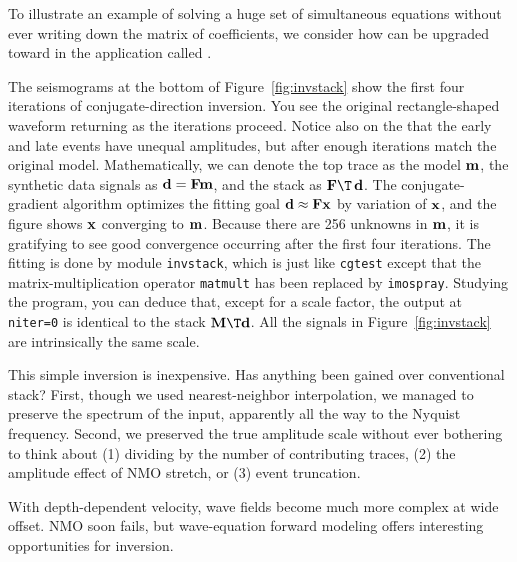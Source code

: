 To illustrate an example of solving a huge set of simultaneous
equations without ever writing down the matrix of coefficients,
we consider how
{\it {}} can be upgraded toward
{\it {}} in the application called .
\par
The seismograms at the bottom of Figure~\ref{fig:invstack}
show the first four iterations of conjugate-direction inversion.
You see the original rectangle-shaped waveform returning
as the iterations proceed.
Notice also on the 
that the early and late events have unequal amplitudes,
but after enough iterations match the original model.
Mathematically,
we can denote the top trace as the model $\bold m$,
the synthetic data signals as $\bold d = \bold F \bold m$,
and the stack as $\bold F\T\,\bold d$.
The conjugate-gradient algorithm optimizes the fitting goal
$\bold d \approx \bold F \bold x$ by variation of $\bold x$,
and the figure shows $\bold x$ converging to $\bold m$.
Because there are 256 unknowns in $\bold m$,
it is gratifying to see good convergence occurring
after the first four iterations.
The fitting is done by module {\tt invstack},
which is just like
\texttt{cgtest}  except that the matrix-multiplication operator
\texttt{matmult}  has been replaced by
\texttt{imospray}. %
Studying the program,
you can deduce that,
except for a scale factor,
the output at {\tt niter=0} is identical to the stack $\bold M\T \bold d$.
All the signals in Figure~\ref{fig:invstack} are intrinsically the same scale.%
\par
This simple inversion is inexpensive.
Has anything been gained over conventional stack?
First,
though we used nearest-neighbor interpolation,
we managed to preserve the spectrum of the input,
apparently all the way to the Nyquist frequency.
Second, we preserved the true amplitude scale
without ever bothering to think about
(1) dividing by the number of contributing traces,
(2) the amplitude effect of NMO stretch, or
(3) event truncation.
\par
With depth-dependent velocity,
wave fields become much more complex at wide offset.
NMO soon fails,
but wave-equation forward modeling
offers interesting opportunities for inversion.

